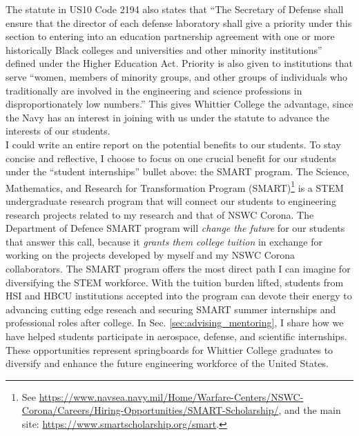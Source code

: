 \documentclass[../../../main.tex]{subfiles}
\begin{document}
The statute in US10 Code 2194 also states that ``The Secretary of Defense shall ensure that the director of each defense laboratory shall give a priority under this section to entering into an education partnership agreement with one or more historically Black colleges and universities and other minority institutions'' defined under the Higher Education Act.  Priority is also given to institutions that serve ``women, members of minority groups, and other groups of individuals who traditionally are involved in the engineering and science professions in disproportionately low numbers.''  This gives Whittier College the advantage, since the Navy has an interest in joining with us under the statute to advance the interests of our students.
\\
\vspace{0.15cm}
I could write an entire report on the potential benefits to our students.  To stay concise and reflective, I choose to focus on one crucial benefit for our students under the ``student internships'' bullet above: the SMART program.  The Science, Mathematics, and Research for Transformation Program (SMART)\footnote{See \url{https://www.navsea.navy.mil/Home/Warfare-Centers/NSWC-Corona/Careers/Hiring-Opportunities/SMART-Scholarship/}, and the main site: \url{https://www.smartscholarship.org/smart}.} is a STEM undergraduate research program that will connect our students to engineering research projects related to my research and that of NSWC Corona.  The Department of Defence SMART program will \textit{change the future} for our students that answer this call, because it \textit{grants them college tuition} in exchange for working on the projects developed by myself and my NSWC Corona collaborators.  The SMART program offers the most direct path I can imagine for diversifying the STEM workforce.  With the tuition burden lifted, students from HSI and HBCU institutions accepted into the program can devote their energy to advancing cutting edge reseach and securing SMART summer internships and professional roles after college.  In Sec. \ref{sec:advising_mentoring}, I share how we have helped students participate in aerospace, defense, and scientific internships.  These opportunities represent springboards for Whittier College graduates to diversify and enhance the future engineering workforce of the United States.
\end{document}

